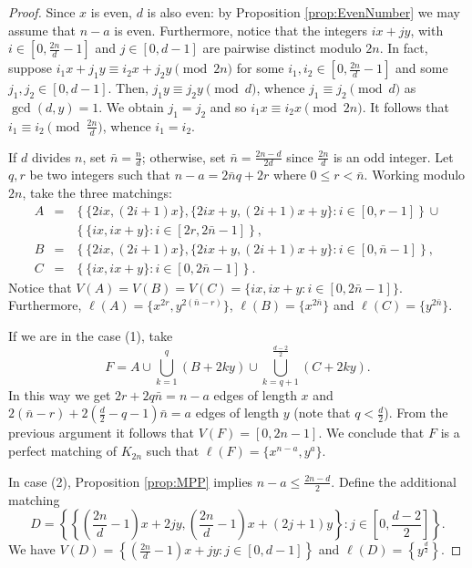 \documentclass{amsart}
\theoremstyle{definition}
\numberwithin{equation}{section}
\begin{document}
\begin{proof}
Since $x$ is even, $d$ is also even: by Proposition \ref{prop:EvenNumber}  we may assume that $n-a$  is even.
Furthermore, notice that the integers $ix+jy$, with $i \in [0,\frac{2n}{d}-1]$ and $j\in [0,d-1]$ are pairwise distinct modulo $2n$.
In fact, suppose $i_1x +j_1y \equiv i_2 x+ j_2 y \pmod{2n}$ for some $i_1,i_2 \in [0, \frac{2n}{d}-1]$ and some $j_1,j_2 \in [0,d-1]$.
Then, $j_1 y \equiv j_2 y \pmod{d}$, whence $j_1 \equiv j_2 \pmod{d}$ as $\gcd(d,y)=1$.
We obtain $j_1=j_2$ and so $i_1x  \equiv i_2 x \pmod{2n}$. It follows that $i_1\equiv i_2 \pmod{\frac{2n}{d}}$,
whence $i_1=i_2$.

If $d$ divides $n$, set $\bar n =\frac{n}{d}$; otherwise,  set $\bar n =\frac{2n-d}{2d}$  since
$\frac{2n}{d}$ is an odd integer.
Let $q,r$ be two integers such that $n-a= 2 \bar n q  + 2r$ where $0\leq r < \bar n$.
Working modulo $2n$, take the three matchings:
$$\begin{array}{rcl}
A &= &\left\{ \{2ix, (2i+1)x \}, \{2ix+y, (2i+1)x+y\} : i \in [0,r-1] \right\} \cup \\
&& \left\{\{ ix, ix+y\}: i \in [2r,2 \bar n -1]\right\},\\[2pt]
B &= & \left\{\{ 2ix, (2i+1)x \},\{ 2ix+y, (2i+1)x+y \} : i \in [0, \bar n -1] \right\},\\[2pt]
C & =& \left\{ \{ix, ix+y \}: i \in [0,2\bar n -1] \right\}.
  \end{array}$$
Notice that $V(A)=V(B)=V(C)=\{ix, ix+y: i \in [0,2\bar n -1] \}$.
Furthermore, $\ell(A)=\{ x^{2r},y^{2(\bar n-r)} \}$,
$\ell(B)=\{x^{2\bar n} \}$ and
$\ell(C)=\{y^{2\bar n} \}$.

If we are in the case (1), take
$$F=A \cup \bigcup_{k=1}^{q} (B + 2ky)\cup \bigcup_{k=q+1}^{\frac{d-2}{2}} (C+2ky).$$
In this way  we get $2r+2q\bar n = n-a$ edges of length $x$ and
$2(\bar n -r)+2\left(\frac{d}{2}-q-1\right)\bar n=a$ edges of length $y$ (note that $q<\frac{d}{2}$).
From the previous argument it follows that $V(F)=[0,2n-1]$.
We conclude that $F$ is a perfect matching of $K_{2n}$ such that $\ell(F)=\{x^{n-a}, y^{a}\}$.

In case (2), Proposition \ref{prop:MPP} implies $n-a\leq \frac{2n-d}{2}$.
Define the additional matching
$$D=\left\{\left\{\left(\frac{2n}{d}-1\right) x + 2jy, \left(\frac{2n}{d}-1\right)x+(2j+1)y\right\}:  j \in \left[0,\frac{d-2}{2}\right]\right\}.$$
We have $V(D)=\left\{\left(\frac{2n}{d}-1\right)x+jy: j \in [0,d-1] \right\}$ and $\ell(D)=\left\{y^{\frac{d}{2}}\right\}$.


\end{proof}
\end{document}
